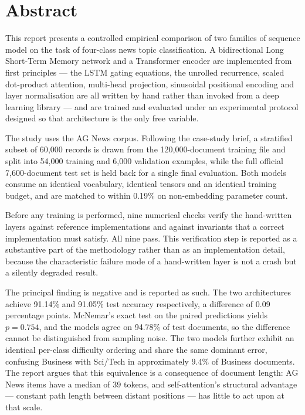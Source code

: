 \documentclass[11pt,a4paper,oneside]{report}
\begin{document}
\setcounter{page}{2}

\chapter*{Abstract}

This report presents a controlled empirical comparison of two families of sequence model on the
task of four-class news topic classification. A bidirectional Long Short-Term Memory network and a
Transformer encoder are implemented from first principles --- the LSTM gating equations, the
unrolled recurrence, scaled dot-product attention, multi-head projection, sinusoidal positional
encoding and layer normalisation are all written by hand rather than invoked from a deep learning
library --- and are trained and evaluated under an experimental protocol designed so that
architecture is the only free variable.

The study uses the AG News corpus. Following the case-study brief, a stratified subset of 60{,}000
records is drawn from the 120{,}000-document training file and split into 54{,}000 training and
6{,}000 validation examples, while the full official 7{,}600-document test set is held back for a
single final evaluation. Both models consume an identical vocabulary, identical tensors and an
identical training budget, and are matched to within 0.19\% on non-embedding parameter count.

Before any training is performed, nine numerical checks verify the hand-written layers against
reference implementations and against invariants that a correct implementation must satisfy. All
nine pass. This verification step is reported as a substantive part of the methodology rather than
as an implementation detail, because the characteristic failure mode of a hand-written layer is not
a crash but a silently degraded result.

The principal finding is negative and is reported as such. The two architectures achieve 91.14\%
and 91.05\% test accuracy respectively, a difference of 0.09 percentage points. McNemar's exact
test on the paired predictions yields $p = 0.754$, and the models agree on 94.78\% of test
documents, so the difference cannot be distinguished from sampling noise. The two models further
exhibit an identical per-class difficulty ordering and share the same dominant error, confusing
Business with Sci/Tech in approximately 9.4\% of Business documents. The report argues that this
equivalence is a consequence of document length: AG News items have a median of 39 tokens, and
self-attention's structural advantage --- constant path length between distant positions --- has
little to act upon at that scale.
\end{document}
